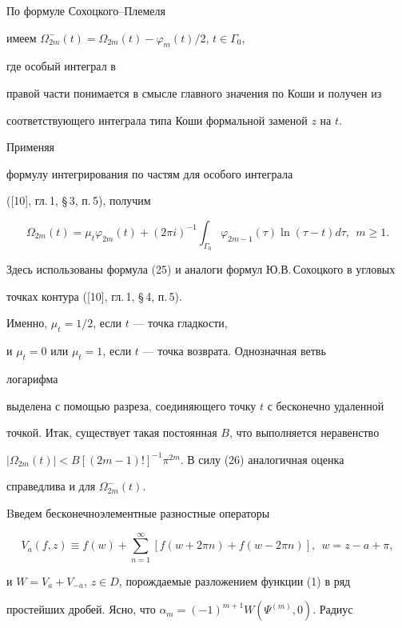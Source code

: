 \begin{pf} 


По формуле Сохоцкого--Племеля 


имеем $\Omega^-_{2m}(t)=\Omega_{2m}(t)-\varphi_m(t)/2$, $t\in\Gamma_0$, 


где особый интеграл в 


правой части понимается в смысле главного значения по Коши и получен из  


соответствующего интеграла типа Коши формальной заменой $z$ на $t$. 


Применяя 


формулу интегрирования по частям для особого интеграла 


([10], гл.\,1, \S\,3, п.\,5), получим 


$$ 


\Omega_{2m}(t)=\mu_t \varphi_{2m}(t)+(2\pi i)^{-1} 


\int_{\Gamma_0} \varphi_{2m-1}(\tau)\ln(\tau-t)d\tau, 


\ \ m\ge1. 


$$ 


Здесь использованы формула (25) и аналоги формул Ю.В.\,Сохоцкого в угловых  


точках контура ([10], гл.\,1, \S\,4, п.\,5). 


Именно, $\mu_t=1/2$, если $t$ --- точка гладкости, 


и $\mu_t=0$ или $\mu_t=1$, если $t$ --- точка возврата. Однозначная ветвь 


логарифма 


выделена с помощью разреза, соединяющего точку $t$ с бесконечно удаленной 


точкой. Итак, существует такая постоянная $B$, что выполняется неравенство  


$|\Omega_{2m}(t)|<B[(2m-1)!]^{-1}\pi^{2m}$. В силу (26) аналогичная оценка 


справедлива и для $\Omega^-_{2m}(t)$. 


 


Bведем бесконечноэлементные разностные операторы 


$$ 


V_a(f,z)\equiv f(w)+\sum^\infty_{n=1} 


[f(w+2\pi n)+f(w-2\pi n)],\ \ w=z-a+\pi, 


$$ 


и $W=V_a+V_{-a}$, $z\in D$, порождаемые разложением функции (1) в ряд  


простейших дробей. Ясно, что $\alpha_m=(-1)^{m+1}W(\Psi^{(m)},0)$. Радиус 



\end{pf}
